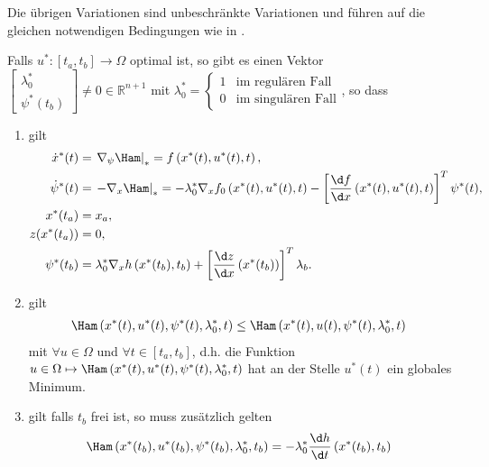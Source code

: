 Die übrigen Variationen sind unbeschränkte Variationen und führen auf die gleichen notwendigen Bedingungen wie in .
\begin{satz}
Falls $u^{\ast}:[t_a,t_b]\rightarrow\Omega$ optimal ist, so gibt es einen Vektor $\begin{bmatrix}
\lambda_0^{\ast}\\ \psi^{\ast}(t_b)
\end{bmatrix}\neq 0\in\mathbb{R}^{n+1}$ mit $\lambda_0^{\ast}=\left\{\begin{array}{cl}
1 & \text{im regulären Fall}\\
0 & \text{im singulären Fall}
\end{array} \right.$, so dass
\begin{enumerate}[label=(\arabic*)]
  \item gilt
  \begin{align*}
  	\dot{x}^{\ast}(t) & = \left.\nabla_{\psi}\Ham\right|_{\ast} = f\left(x^{\ast}(t),u^{\ast}(t),t \right),\\
  	\dot{\psi}^{\ast}(t) & = \left.-\nabla_x\Ham\right|_{\ast}=-\lambda_0^{\ast}\nabla_xf_0\left(x^{\ast}(t),u^{\ast}(t),t \right)-\left[\frac{\d
  	f}{\d x}\left(x^{\ast}(t),u^{\ast}(t),t \right) \right]^T\psi^{\ast}(t),\\
  	x^{\ast}(t_a) & = x_a,\\
  	z(x^{\ast}(t_a)) & = 0,\\
  	\psi^{\ast}(t_b) & = \lambda_0^{\ast}\nabla_xh\left(x^{\ast}(t_b),t_b \right)+\left[\frac{\d z}{\d x}\left(x^{\ast}(t_b) \right)
  	\right]^T\lambda_b.
  \end{align*}
  \item gilt
  \begin{align}
  	\Ham\left(x^{\ast}(t),u^{\ast}(t),\psi^{\ast}(t),\lambda_0^{\ast},t \right) & \leq
  	\Ham\left(x^{\ast}(t),u(t),\psi^{\ast}(t),\lambda_0^{\ast},t \right)	\label{eqn:kap_2_Pontryagin_min}
  \end{align}
  mit $\forall u\in\Omega$ und $\forall t\in[t_a,t_b]$, d.h. die Funktion
  $u\in\Omega\mapsto\Ham\left(x^{\ast}(t),u^{\ast}(t),\psi^{\ast}(t),\lambda_0^{\ast},t \right)$ hat an der Stelle $u^{\ast}(t)$ ein globales Minimum.
  \item gilt falls $t_b$ frei ist, so muss zusätzlich gelten
  \begin{align*}
  	\Ham\left(x^{\ast}(t_b),u^{\ast}(t_b),\psi^{\ast}(t_b),\lambda_0^{\ast},t_b \right) & = -\lambda_0^{\ast}\frac{\d h}{\d t}\left(x^{\ast}(t_b),t_b
  	\right)
  \end{align*}
\end{enumerate}
\end{satz}

